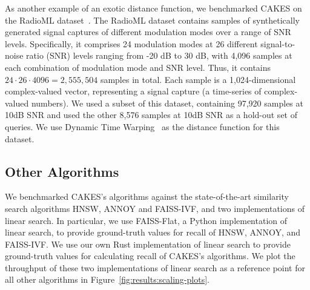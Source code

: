 As another example of an exotic distance function, we benchmarked CAKES on the RadioML dataset~\cite{oshea2018radioml}.
The RadioML dataset contains samples of synthetically generated signal captures of different modulation modes over a range of SNR levels.
Specifically, it comprises 24 modulation modes at 26 different signal-to-noise ratio (SNR) levels ranging from -20 dB to 30 dB, with 4,096 samples at each combination of modulation mode and SNR level.
Thus, it contains $24 \cdot 26 \cdot 4096 = 2,555,504$ samples in total.
Each sample is a 1,024-dimensional complex-valued vector, representing a signal capture (a time-series of complex-valued numbers).
We used a subset of this dataset, containing 97,920 samples at 10dB SNR and used the other 8,576 samples at 10dB SNR as a hold-out set of queries.
We use Dynamic Time Warping~\cite{muller2007dynamic} as the distance function for this dataset.


\subsection{Other Algorithms}
\label{sec:datasets-and-benchmarks:other-algorithms}

We benchmarked CAKES's algorithms against the state-of-the-art similarity search algorithms HNSW, ANNOY and FAISS-IVF, and two implementations of linear search.
In particular, we use FAISS-Flat, a Python implementation of linear search, to provide ground-truth values for recall of HNSW, ANNOY, and FAISS-IVF.
We use our own Rust implementation of linear search to provide ground-truth values for calculating recall of CAKES's algorithms.
We plot the throughput of these two implementations of linear search as a reference point for all other algorithms in Figure~\ref{fig:results:scaling-plots}.
